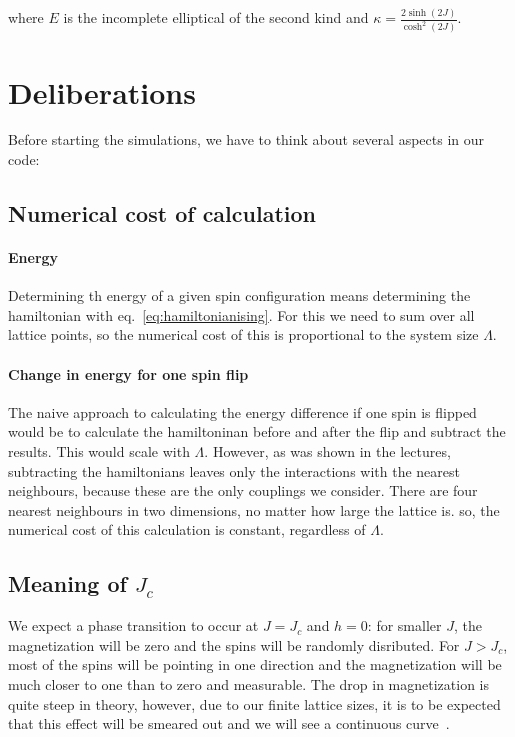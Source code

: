 \documentclass{scrartcl}
\begin{document}
where $E$ is the incomplete elliptical of the second kind and $\kappa=\frac{2\sinh(2J)}{\cosh^2(2J)}$.

\section{Deliberations}
Before starting the simulations, we have to think about several aspects in our code:
\subsection{Numerical cost of calculation}
\paragraph{Energy}
Determining th energy of a given spin configuration means determining the hamiltonian with eq.~\ref{eq:hamiltonianising}. For this we need to sum over all lattice points, so the numerical cost of this is proportional to the system size $\Lambda$.

\paragraph{Change in energy for one spin flip}
The naive approach to calculating the energy difference if one spin is flipped would be to calculate the hamiltoninan before and after the flip and subtract the results. This would scale with $\Lambda$. However, as was shown in the lectures, subtracting the hamiltonians leaves only the interactions with the nearest neighbours, because these are the only couplings we consider. There are four nearest neighbours in two dimensions, no matter how large the lattice is. so, the numerical cost of this calculation is constant, regardless of $\Lambda$.

\subsection{Meaning of $J_c$} 
We expect a phase transition to occur at $J=J_c$ and $h=0$: for smaller $J$, the magnetization will be zero and the spins will be randomly disributed. For $J>J_c$, most of the spins will be pointing in one direction and the magnetization will be much closer to one than to zero and measurable. The drop in magnetization is quite steep in theory, however, due to our finite lattice sizes, it is to be expected that this effect will be smeared out and we will see a continuous curve~\cite{YangMagnetization}\cite{binderheermann}.
\end{document}

